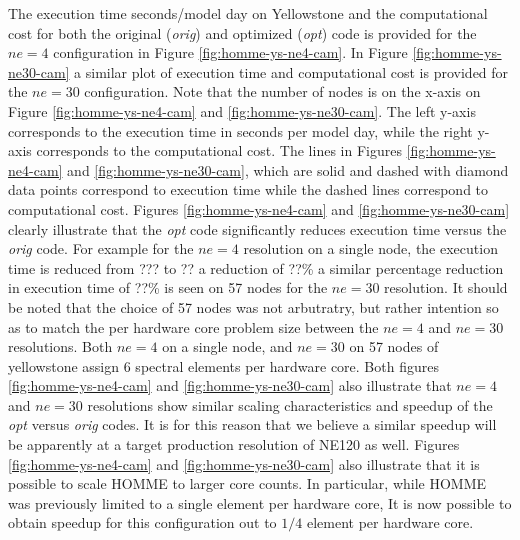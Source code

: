 The execution time seconds/model day on Yellowstone and the computational cost for both the original ({\em orig})  and optimized ({\em opt}) code is provided for the $ne=4$ configuration in Figure \ref{fig:homme-ys-ne4-cam}. In Figure \ref{fig:homme-ys-ne30-cam} a similar plot of execution time and computational cost is provided for the $ne=30$ configuration.  Note that the number of nodes is on the x-axis on Figure \ref{fig:homme-ys-ne4-cam} and \ref{fig:homme-ys-ne30-cam}.  The left y-axis corresponds to the execution time in seconds per model day, while the right y-axis corresponds to the computational cost. The lines in Figures \ref{fig:homme-ys-ne4-cam} and \ref{fig:homme-ys-ne30-cam}, which are solid and dashed with diamond data points correspond to execution time while the dashed lines  correspond to computational cost.  Figures  \ref{fig:homme-ys-ne4-cam} and \ref{fig:homme-ys-ne30-cam} clearly illustrate that the {\em opt} code significantly reduces execution time versus the {\em orig} code.  For example for the $ne=4$ resolution on a single node, the execution time is reduced from {\color{red} ??? to ?? a reduction of ??\%} a similar percentage reduction in execution time of {\color{red} ??\%} is seen on 57 nodes for the $ne=30$ resolution.  It should be  noted that the choice of 57 nodes was not arbutratry, but rather intention so as to match the per hardware core problem size between the $ne=4$ and $ne=30$ resolutions.  Both  $ne=4$ on a single node, and $ne=30$ on 57 nodes of yellowstone assign 6 spectral elements per hardware core.  Both figures \ref{fig:homme-ys-ne4-cam} and \ref{fig:homme-ys-ne30-cam} also illustrate that $ne=4$ and $ne=30$ resolutions show similar scaling characteristics and speedup of the {\em opt} versus {\em orig} codes. It is for this reason that we believe a similar speedup will be apparently at a target production resolution of NE120 as well.   Figures \ref{fig:homme-ys-ne4-cam} and \ref{fig:homme-ys-ne30-cam} also illustrate that it is possible to scale HOMME to larger core counts.  In particular, while HOMME was previously limited to a single element per hardware core, It is now possible to obtain speedup for this configuration out to $1/4$ element per hardware core.
 
